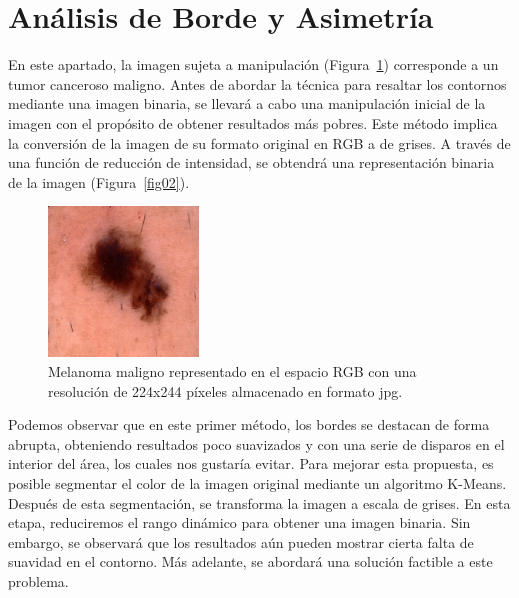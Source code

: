 \section{Análisis de Borde y Asimetría}

En este apartado, la imagen sujeta a manipulación (Figura~\ref{fig01}) corresponde a un tumor canceroso maligno. Antes de abordar la técnica para resaltar los contornos mediante una imagen binaria, se llevará a cabo una manipulación inicial de la imagen con el propósito de obtener resultados más pobres. Este método implica la conversión de la imagen de su formato original en RGB a de grises. A través de una función de reducción de intensidad, se obtendrá una representación binaria de la imagen (Figura~\ref{fig02}).

\begin{figure}[h] 
	\begin{center} 
		\includegraphics[width=4cm]{images/F01-A.png} 
	\end{center} 
	\vspace{-10pt}
	\caption{\footnotesize Melanoma maligno representado en el espacio RGB con una resolución de 224x244 píxeles almacenado en formato jpg.}  
	\label{fig01} 
\end{figure}

Podemos observar que en este primer método, los bordes se destacan de forma abrupta, obteniendo resultados poco suavizados y con una serie de disparos en el interior del área, los cuales nos gustaría evitar. Para mejorar esta propuesta, es posible segmentar el color de la imagen original mediante un algoritmo K-Means. Después de esta segmentación, se transforma la imagen a escala de grises. En esta etapa, reduciremos el rango dinámico para obtener una imagen binaria. Sin embargo, se observará que los resultados aún pueden mostrar cierta falta de suavidad en el contorno. Más adelante, se abordará una solución factible a este problema.

